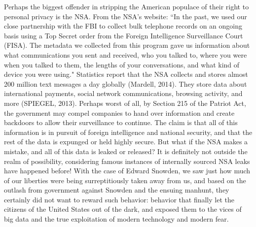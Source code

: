 \documentclass[12pt]{article}
\begin{document}
\begin{flushleft}
    \par Perhaps the biggest offender in stripping the American populace of 
    their right to personal privacy is the NSA. From the NSA's website:
    ``In the past, we used our close partnership with the FBI to collect 
    bulk telephone records on an ongoing basis using a Top Secret order from the 
    Foreign Intelligence Surveillance Court (FISA). The metadata we collected 
    from this program gave us information about what communications you sent and 
    received, who you talked to, where you were when you talked to them, the 
    lengths of your conversations, and what kind of device you were using."
    Statistics report that the NSA collects and stores almost 200 million text 
    messages a day globally (Mardell, 2014). They store data about international 
    payments, social network communications, browsing activity, and more 
    (SPIEGEL, 2013). Perhaps worst of all, by Section 215 of the Patriot Act, 
    the government may compel companies to hand over information and create 
    backdoors to allow their surveillance to continue. The claim is that all of 
    this information is in pursuit of foreign intelligence and national 
    security, and that the rest of the data is expunged or held highly secure.  
    But what if the NSA makes a mistake, and all of this data is leaked or 
    released? It is definitely not outside the realm of possibility, considering 
    famous instances of internally sourced NSA leaks have happened before! With 
    the case of Edward Snowden, we saw just how much of our liberties were being 
    surreptitiously taken away from us, and based on the outlash from government 
    against Snowden and the ensuing manhunt, they certainly did not want to 
    reward such behavior: behavior that finally let the citizens of the United 
    States out of the dark, and exposed them to the vices of big data and the 
    true exploitation of modern technology and modern fear.


\end{flushleft}
\end{document}

